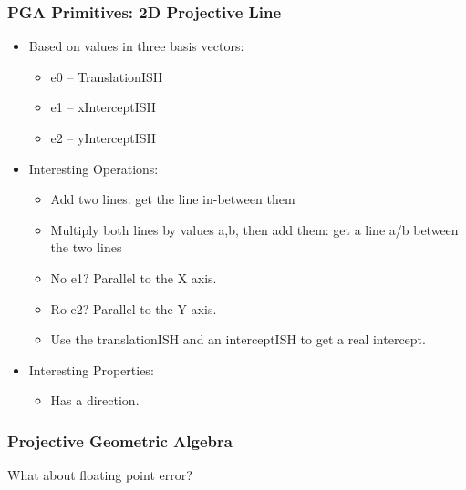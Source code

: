 \documentclass[hyperref={pdfpagemode=FullScreen},aspectratio=169]{beamer}
\begin{document}
\begin{frame}
  \frametitle{PGA Primitives: 2D Projective Line}
  \begin{itemize}
  \item Based on values in three basis vectors:
    \begin {itemize}
    \item e0 -- TranslationISH
    \item e1 -- xInterceptISH
    \item e2 -- yInterceptISH
    \end{itemize}
  \item Interesting Operations:
    \begin {itemize}
    \item Add two lines: get the line in-between them
    \item Multiply both lines by values a,b, then add them: get a line a/b between the two lines
    \item No e1? Parallel to the X axis.
    \item Ro e2? Parallel to the Y axis.
    \item Use the translationISH and an interceptISH to get a real intercept.
    \end{itemize}
  \item Interesting Properties:
    \begin {itemize}
    \item Has a direction.
    \end{itemize}
  \end{itemize}
\end{frame}

\begin{frame}
  \frametitle{Projective Geometric Algebra}
  \Huge{\centerline{What about floating point error?}}
\end{frame}
\end{document}
